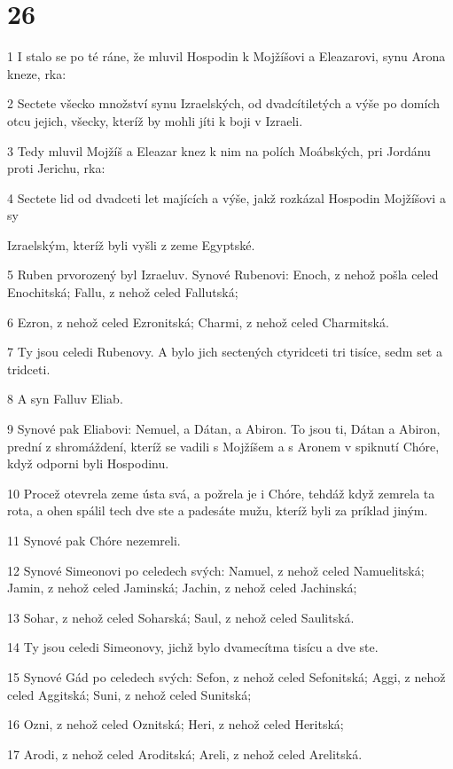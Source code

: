 \chapter{26}

\par 1 I stalo se po té ráne, že mluvil Hospodin k Mojžíšovi a Eleazarovi, synu Arona kneze, rka:
\par 2 Sectete všecko množství synu Izraelských, od dvadcítiletých a výše po domích otcu jejich, všecky, kteríž by mohli jíti k boji v Izraeli.
\par 3 Tedy mluvil Mojžíš a Eleazar knez k nim na polích Moábských, pri Jordánu proti Jerichu, rka:
\par 4 Sectete lid od dvadceti let majících a výše, jakž rozkázal Hospodin Mojžíšovi a sy\par Izraelským, kteríž byli vyšli z zeme Egyptské.
\par 5 Ruben prvorozený byl Izraeluv. Synové Rubenovi: Enoch, z nehož pošla celed Enochitská; Fallu, z nehož celed Fallutská;
\par 6 Ezron, z nehož celed Ezronitská; Charmi, z nehož celed Charmitská.
\par 7 Ty jsou celedi Rubenovy. A bylo jich sectených ctyridceti tri tisíce, sedm set a tridceti.
\par 8 A syn Falluv Eliab.
\par 9 Synové pak Eliabovi: Nemuel, a Dátan, a Abiron. To jsou ti, Dátan a Abiron, prední z shromáždení, kteríž se vadili s Mojžíšem a s Aronem v spiknutí Chóre, když odporni byli Hospodinu.
\par 10 Procež otevrela zeme ústa svá, a požrela je i Chóre, tehdáž když zemrela ta rota, a ohen spálil tech dve ste a padesáte mužu, kteríž byli za príklad jiným.
\par 11 Synové pak Chóre nezemreli.
\par 12 Synové Simeonovi po celedech svých: Namuel, z nehož celed Namuelitská; Jamin, z nehož celed Jaminská; Jachin, z nehož celed Jachinská;
\par 13 Sohar, z nehož celed Soharská; Saul, z nehož celed Saulitská.
\par 14 Ty jsou celedi Simeonovy, jichž bylo dvamecítma tisícu a dve ste.
\par 15 Synové Gád po celedech svých: Sefon, z nehož celed Sefonitská; Aggi, z nehož celed Aggitská; Suni, z nehož celed Sunitská;
\par 16 Ozni, z nehož celed Oznitská; Heri, z nehož celed Heritská;
\par 17 Arodi, z nehož celed Aroditská; Areli, z nehož celed Arelitská.
